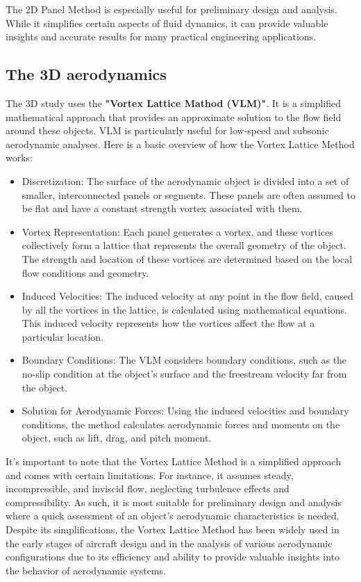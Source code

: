 The 2D Panel Method is especially useful for preliminary design and analysis. While it simplifies certain aspects of fluid dynamics, it can provide valuable insights and accurate results for many practical engineering applications.

\subsection{The 3D aerodynamics}
\label{sub:Ch2.1.2}

The 3D study uses the \textbf{"Vortex Lattice Mathod (VLM)"}. It is a simplified mathematical approach that provides an approximate solution to the flow field around these objects. VLM is particularly useful for low-speed and subsonic aerodynamic analyses. Here is a basic overview of how the Vortex Lattice Method works:
\begin{itemize}
    \item Discretization: The surface of the aerodynamic object is divided into a set of smaller, interconnected panels or segments. These panels are often assumed to be flat and have a constant strength vortex associated with them.
    \item Vortex Representation: Each panel generates a vortex, and these vortices collectively form a lattice that represents the overall geometry of the object. The strength and location of these vortices are determined based on the local flow conditions and geometry.
    \item Induced Velocities: The induced velocity at any point in the flow field, caused by all the vortices in the lattice, is calculated using mathematical equations. This induced velocity represents how the vortices affect the flow at a particular location.
    \item Boundary Conditions: The VLM considers boundary conditions, such as the no-slip condition at the object's surface and the freestream velocity far from the object.
    \item Solution for Aerodynamic Forces: Using the induced velocities and boundary conditions, the method calculates aerodynamic forces and moments on the object, such as lift, drag, and pitch moment.
\end{itemize}

It's important to note that the Vortex Lattice Method is a simplified approach and comes with certain limitations. For instance, it assumes steady, incompressible, and inviscid flow, neglecting turbulence effects and compressibility. As such, it is most suitable for preliminary design and analysis where a quick assessment of an object's aerodynamic characteristics is needed. Despite its simplifications, the Vortex Lattice Method has been widely used in the early stages of aircraft design and in the analysis of various aerodynamic configurations due to its efficiency and ability to provide valuable insights into the behavior of aerodynamic systems.

